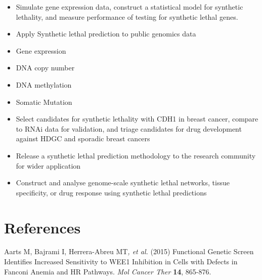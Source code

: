 \begin{itemize}

\item 

Simulate gene expression data, construct a statistical model for
synthetic lethality, and measure performance of testing for synthetic
lethal genes. \ 

\item 

Apply Synthetic lethal prediction to public genomics data



\item 

Gene expression

\item 

DNA copy number

\item 

DNA methylation

\item 

Somatic Mutation

\item 

Select candidates for synthetic lethality with CDH1 in breast cancer,
compare to RNAi data for validation, and triage candidates for drug
development against HDGC and sporadic breast cancers

\item 

Release a synthetic lethal prediction methodology to the research
community for wider application 

\item 

Construct and analyse genome-scale synthetic lethal networks, tissue
specificity, or drug response using synthetic lethal predictions

\end{itemize}

\clearpage\section{References}
A\hypertarget{ENREF1}{}arts M, Bajrami I, Herrera-Abreu MT\textit{, et
al.} (2015) Functional Genetic Screen Identifies Increased Sensitivity
to WEE1 Inhibition in Cells with Defects in Fanconi Anemia and HR
Pathways. \textit{Mol Cancer Ther} \textbf{14}, 865-876.



